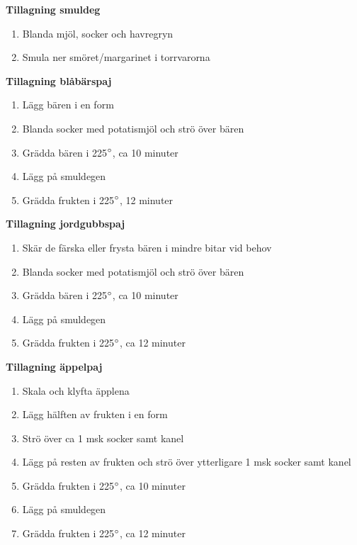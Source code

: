 \documentclass[a4paper,12pt]{article}
\begin{document}
\begin{multicols*}{2}

\noindent \textbf{Tillagning smuldeg}
\begin{enumerate}
	\itemsep0cm
	\item Blanda mjöl, socker och havregryn
	\item Smula ner smöret/margarinet i torrvarorna	
\end{enumerate}

\noindent \textbf{Tillagning blåbärspaj}
\begin{enumerate}
	\itemsep0cm
	\item Lägg bären i en form
	\item Blanda socker med potatismjöl och strö över bären
	\item Grädda bären i 225$\degree$, ca 10 \mbox{minuter}
	\item Lägg på smuldegen
	\item Grädda frukten i 225$\degree$, 12 \mbox{minuter}
\end{enumerate}
\vfill
\columnbreak

\noindent \textbf{Tillagning jordgubbspaj}
\begin{enumerate}
	\itemsep0cm
	\item Skär de färska eller frysta bären i mindre bitar vid behov
	\item Blanda socker med potatismjöl och strö över bären
	\item Grädda bären i 225$\degree$, ca 10 \mbox{minuter}
	\item Lägg på smuldegen
	\item Grädda frukten i 225$\degree$, ca 12 \mbox{minuter}
\end{enumerate}

\noindent \textbf{Tillagning äppelpaj}
\begin{enumerate}
	\itemsep0cm
	\item Skala och klyfta äpplena
	\item Lägg hälften av frukten i en form
	\item Strö över ca 1 msk socker samt kanel
	\item Lägg på resten av frukten och strö över ytterligare 1 msk socker samt kanel
	\item Grädda frukten i 225$\degree$, ca 10 \mbox{minuter}
	\item Lägg på smuldegen
	\item Grädda frukten i 225$\degree$, ca 12 \mbox{minuter}
\end{enumerate}

\end{multicols*}
\end{document}
